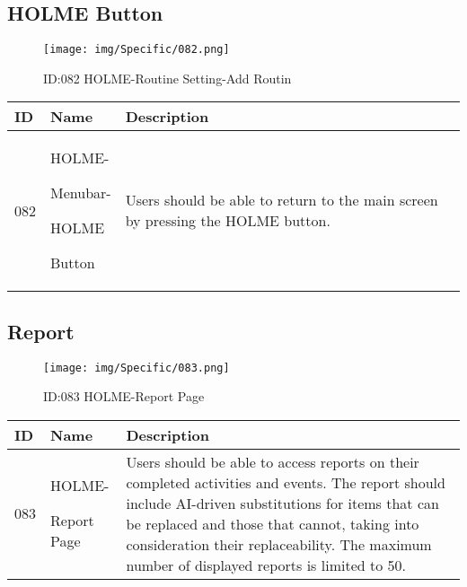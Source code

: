 \documentclass[conference]{IEEEtran}
\begin{document}
\begin{enumerate}
\subsection{HOLME Button}
\begin{figure}[h]
\centering                                         
\texttt{[image: img/Specific/082.png]}
\caption{ID:082 HOLME-Routine Setting-Add Routin}
\end{figure}
\begin{table}[h]
\def\arraystretch{1.2} \small
    \begin{tabular}{|p{1cm}|p{1.8cm}|p{5.0cm}|}
        \hline
        ID & Name & Description\\ \hline
         082 \par  & HOLME-\par Menubar- \par HOLME \par Button & 
         Users should be able to return to the main screen by pressing the HOLME button.
         \\ \hline
    \end{tabular}
\end{table}

\vspace{1cm}
\subsection{Report}
\begin{figure}[h]
\centering                                         
\texttt{[image: img/Specific/083.png]}
\caption{ID:083 HOLME-Report Page}
\end{figure}
\begin{table}[h]
\def\arraystretch{1.2} \small
    \begin{tabular}{|p{1cm}|p{1.8cm}|p{5.0cm}|}
        \hline
        ID & Name & Description\\ \hline
         083 \par  & HOLME-\par Report Page & 
        Users should be able to access reports on their completed activities and events. The report should include AI-driven substitutions for items that can be replaced and those that cannot, taking into consideration their replaceability. The maximum number of displayed reports is limited to 50.
         \\ \hline
    \end{tabular}
\end{table}
\clearpage



\end{enumerate}
\end{document}
